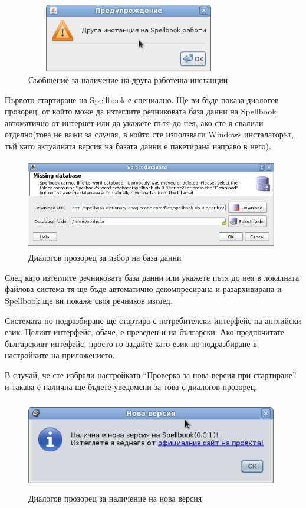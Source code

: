 \begin{figure}[htbp]
  \caption{Съобщение за наличение на друга работеща инстанции}
  \centering
  \includegraphics[width=90mm, height=30mm]{images/already-running.png}
\end{figure}

Първото стартиране на Spellbook е специално. Ще ви бъде показа
диалогов прозорец, от който може да изтеглите речниковата база данни
на Spellbook автоматично от интернет или да укажете пътя до нея, ако
сте я свалили отделно(това не важи за случая, в който сте използвали
Windows инсталаторът, тъй като актуалната версия на базата данни е
пакетирана направо в него).
\begin{figure}[htbp]
  \caption{Диалогов прозорец за избор на база данни}
  \centering
  \includegraphics[width=110mm, height=40mm]{images/select_db.png}
\end{figure}

След като изтеглите речниковата база данни или укажете пътя до нея в
локалната файлова система тя ще бъде автоматично декомпресирана и
разархивирана и Spellbook ще ви покаже своя речников изглед.

Системата по подразбиране ще стартира с потребителски интерфейс на
английски език. Целият интерфейс, обаче, е преведен и на
български. Ако предпочитате българският интефейс, просто го задайте
като език по подразбиране в настройките на приложението.

В случай, че сте избрали настройката "`Проверка за нова версия при
стартиране"' и такава е налична ще бъдете уведомени за това с диалогов
прозорец.

\begin{figure}[htbp]
  \caption{Диалогов прозорец за наличение на нова версия}
  \centering
  \includegraphics[width=110mm, height=40mm]{images/new-version.png}
\end{figure}

